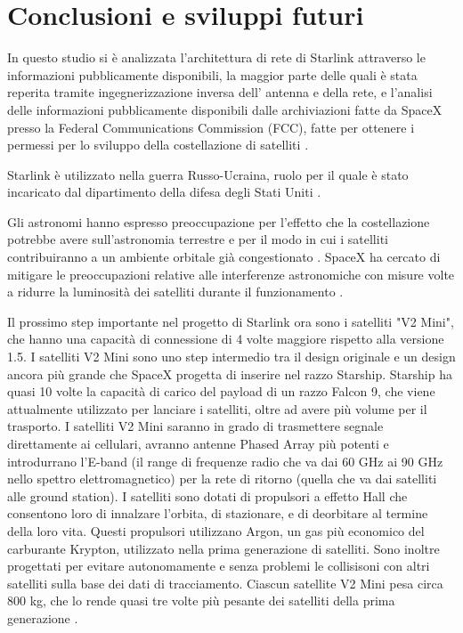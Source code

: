 
\chapter{Conclusioni e sviluppi futuri}
\label{chp:conclusions}

In questo studio si è analizzata l'architettura di rete di Starlink attraverso le informazioni pubblicamente disponibili, la maggior parte delle quali è stata reperita tramite ingegnerizzazione inversa dell' antenna e della rete, e l'analisi delle informazioni pubblicamente disponibili dalle archiviazioni fatte da SpaceX presso la Federal Communications Commission (FCC), fatte per ottenere i permessi per lo sviluppo della costellazione di satelliti \cite{jonathan_mcdowell_section_nodate}.

Starlink è utilizzato nella guerra Russo-Ucraina, ruolo per il quale è stato incaricato dal dipartimento della difesa degli Stati Uniti \cite{amanda_macias_pentagon_2023}.

Gli astronomi hanno espresso preoccupazione per l'effetto che la costellazione potrebbe avere sull'astronomia terrestre e per il modo in cui i satelliti contribuiranno a un ambiente orbitale già congestionato \cite{nadia_drake_will_2019}.
SpaceX ha cercato di mitigare le preoccupazioni relative alle interferenze astronomiche con misure volte a ridurre la luminosità dei satelliti durante il funzionamento \cite{starlink_brightness_nodate}.

Il prossimo step importante nel progetto di Starlink ora sono i satelliti "V2 Mini", che hanno una capacità di connessione di 4 volte maggiore rispetto alla versione 1.5.
I satelliti V2 Mini sono uno step intermedio tra il design originale e un design ancora più grande che SpaceX progetta di inserire nel razzo Starship.
Starship ha quasi 10 volte la capacità di carico del payload di un razzo Falcon 9, che viene attualmente utilizzato per lanciare i satelliti,  oltre ad avere più volume per il trasporto.
I satelliti V2 Mini saranno in grado di trasmettere segnale direttamente ai cellulari, avranno antenne Phased Array più potenti e introdurrano l'E-band (il range di frequenze radio che va dai 60 GHz ai 90 GHz nello spettro elettromagnetico) per la rete di ritorno (quella che va dai satelliti alle ground station).
I satelliti sono dotati di propulsori a effetto Hall che consentono loro di innalzare l'orbita, di stazionare, e di deorbitare al termine della loro vita.
Questi propulsori utilizzano Argon, un gas più economico del carburante Krypton, utilizzato nella prima generazione di satelliti.
Sono inoltre progettati per evitare autonomamente e senza problemi le collisisoni con altri satelliti sulla base dei dati di tracciamento.
Ciascun satellite V2 Mini pesa circa 800 kg, che lo rende quasi tre volte più pesante dei satelliti della prima generazione \cite{starlink_secon_nodate}.

